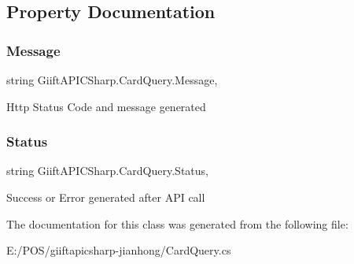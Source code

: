 \subsection{Property Documentation}
\mbox{\label{class_giift_a_p_i_c_sharp_1_1_card_query_a94152f3f72bc22b7308531877b7ff0df}} 
\subsubsection{\texorpdfstring{Message}{Message}}
{\footnotesize\ttfamily string Giift\+A\+P\+I\+C\+Sharp.\+Card\+Query.\+Message\hspace{0.3cm}{\ttfamily [get]}, {\ttfamily [set]}}



Http Status Code and message generated 

\mbox{\label{class_giift_a_p_i_c_sharp_1_1_card_query_af75ace779849f5298e4343f6bb50f589}} 
\subsubsection{\texorpdfstring{Status}{Status}}
{\footnotesize\ttfamily string Giift\+A\+P\+I\+C\+Sharp.\+Card\+Query.\+Status\hspace{0.3cm}{\ttfamily [get]}, {\ttfamily [set]}}



Success or Error generated after A\+PI call 



The documentation for this class was generated from the following file\+:\begin{DoxyCompactItemize}
\item 
E\+:/\+P\+O\+S/giiftapicsharp-\/jianhong/Card\+Query.\+cs\end{DoxyCompactItemize}
